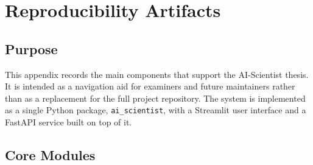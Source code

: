 \chapter{Reproducibility Artifacts}\label{appendix:artifacts}

\section{Purpose}

This appendix records the main components that support the AI-Scientist thesis. It is intended as a navigation aid
for examiners and future maintainers rather than as a replacement for the full project repository. The system is
implemented as a single Python package, \texttt{ai\_scientist}, with a Streamlit user interface and a FastAPI
service built on top of it.

\section{Core Modules}

